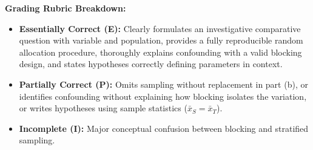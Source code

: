 \begin{frqrubricbox}
\textbf{Grading Rubric Breakdown:}\\
\begin{itemize}
  \item \textbf{Essentially Correct (E):} Clearly formulates an investigative comparative question with variable and population, provides a fully reproducible random allocation procedure, thoroughly explains confounding with a valid blocking design, and states hypotheses correctly defining parameters in context.
  \item \textbf{Partially Correct (P):} Omits sampling without replacement in part (b), or identifies confounding without explaining how blocking isolates the variation, or writes hypotheses using sample statistics ($\bar{x}_S = \bar{x}_T$).
  \item \textbf{Incomplete (I):} Major conceptual confusion between blocking and stratified sampling.
\end{itemize}
\end{frqrubricbox}

